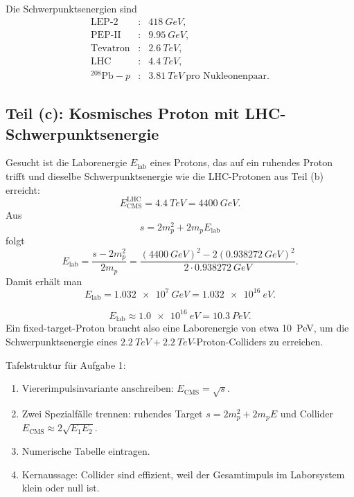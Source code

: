 \documentclass[11pt,a4paper]{scrartcl}
\newcommand{\paren}[1]{\left( #1 \right)}
\newcommand{\Ecm}{E_{\mathrm{CMS}}}
\theoremstyle{definition}
\theoremstyle{plain}
\theoremstyle{remark}
\begin{document}
\begin{answerbox}
Die Schwerpunktsenergien sind
\[
\boxed{\begin{array}{rcl}
\mathrm{LEP\text{-}2} &:& \SI{418}{GeV},\\
\mathrm{PEP\text{-}II} &:& \SI{9.95}{GeV},\\
\mathrm{Tevatron} &:& \SI{2.6}{TeV},\\
\mathrm{LHC} &:& \SI{4.4}{TeV},\\
^{208}\mathrm{Pb}-p &:& \SI{3.81}{TeV}\ \text{pro Nukleonenpaar}.
\end{array}}
\]
\end{answerbox}

\subsection{Teil (c): Kosmisches Proton mit LHC-Schwerpunktsenergie}

\begin{calculationbox}
Gesucht ist die Laborenergie $E_{\mathrm{lab}}$ eines Protons, das auf ein ruhendes Proton trifft und dieselbe Schwerpunktsenergie wie die LHC-Protonen aus Teil (b) erreicht:
\[
    \Ecm^{\mathrm{LHC}}=\SI{4.4}{TeV}=\SI{4400}{GeV}.
\]
Aus
\[
    s=2m_p^2+2m_pE_{\mathrm{lab}}
\]
folgt
\[
    E_{\mathrm{lab} }
    =\frac{s-2m_p^2}{2m_p}
    =\frac{\paren{\SI{4400}{GeV}}^2-2\paren{\SI{0.938272}{GeV}}^2}{2\cdot \SI{0.938272}{GeV}}.
\]
Damit erhält man
\[
    E_{\mathrm{lab}}=\SI{1.032e7}{GeV}=\SI{1.032e16}{eV}.
\]
\end{calculationbox}

\begin{answerbox}
\[
    \boxed{E_{\mathrm{lab}}\approx \SI{1.0e16}{eV}=\SI{10.3}{PeV}.}
\]
Ein fixed-target-Proton braucht also eine Laborenergie von etwa \SI{10}{PeV}, um die Schwerpunktsenergie eines $\SI{2.2}{TeV}+\SI{2.2}{TeV}$-Proton-Colliders zu erreichen.
\end{answerbox}

\begin{talkbox}
Tafelstruktur für Aufgabe 1:
\begin{enumerate}[label=\arabic*.]
    \item Viererimpulsinvariante anschreiben: $\Ecm=\sqrt{s}$.
    \item Zwei Spezialfälle trennen: ruhendes Target $s=2m_p^2+2m_pE$ und Collider $\Ecm\approx2\sqrt{E_1E_2}$.
    \item Numerische Tabelle eintragen.
    \item Kernaussage: Collider sind effizient, weil der Gesamtimpuls im Laborsystem klein oder null ist.
\end{enumerate}
\end{talkbox}
\end{document}
